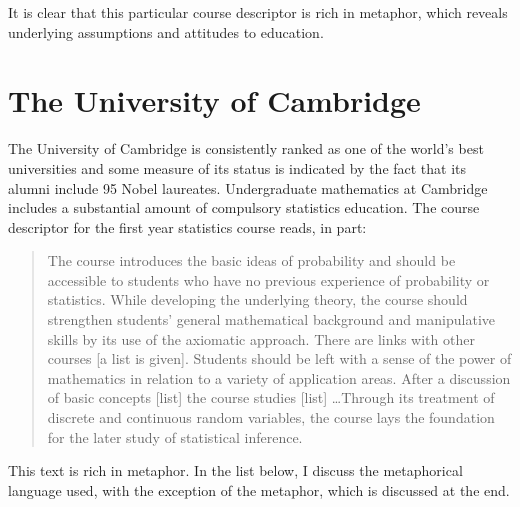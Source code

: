 It is clear that this particular course descriptor is rich in
metaphor, which reveals underlying assumptions and attitudes to
education.

\section{The University of Cambridge}

The University of Cambridge is consistently ranked as one of the
world's best universities and some measure of its status is indicated
by the fact that its alumni include 95 Nobel laureates.  Undergraduate
mathematics at Cambridge includes a substantial amount of compulsory
statistics education.  The course descriptor for the first year
statistics course reads, in part:

\begin{singlespace}
\begin{quote}
The course introduces the basic ideas of probability and should be
accessible to students who have no previous experience of probability
or statistics.  While developing the underlying theory, the course
should strengthen students' general mathematical background and
manipulative skills by its use of the axiomatic approach.  There are
links with other courses [a list is given].  Students should be left
with a sense of the power of mathematics in relation to a variety of
application areas.  After a discussion of basic concepts [list] the
course studies [list] \ldots Through its treatment of discrete and
continuous random variables, the course lays the foundation for the
later study of statistical inference.
\end{quote}
\end{singlespace}

\noindent
This text is rich in metaphor.   In the list below, I discuss the
metaphorical language used, with the exception of the
 metaphor, which is discussed at the end.

